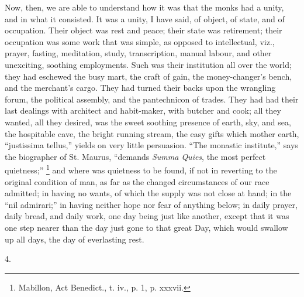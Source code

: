 Now, then, we are able to understand how it was that the monks had
a unity, and in what it consisted. It was a unity, I have said, of
object, of state, and of occupation. Their object was rest and peace;
their state was retirement; their occupation was some work that was
simple, as opposed to intellectual, viz., prayer, fasting, meditation,
study, transcription, manual labour, and other unexciting, soothing
employments. Such was their institution all over the world; they had
eschewed the busy mart, the craft of gain, the money-changer's
bench, and the merchant's cargo. They had turned their backs upon the
wrangling forum, the political assembly, and the pantechnicon of
trades. They had had their last dealings with architect and
habit-maker, with butcher and cook; all they wanted, all they desired,
was the sweet soothing presence of earth, sky, and sea, the hospitable
cave, the bright running stream, the easy gifts which mother earth,
``justissima tellus,'' yields on very little persuasion.
``The monastic institute,'' says the biographer of St. Maurus,
``demands \emph{Summa Quies}, the most perfect quietness;'' \footnote{Mabillon, Act
Benedict., t. iv., p. 1, p. xxxvii.} and where was quietness to be found, if not in reverting to the
original condition of man, as far as the changed circumstances of our
race admitted; in having no wants, of which the supply was not close
at hand; in the ``nil admirari;'' in having neither hope nor
fear of anything below; in daily prayer, daily bread, and daily work,
one day being just like another, except that it was one step nearer
than the day just gone to that great Day, which would swallow up all
days, the day of everlasting rest.

4.

